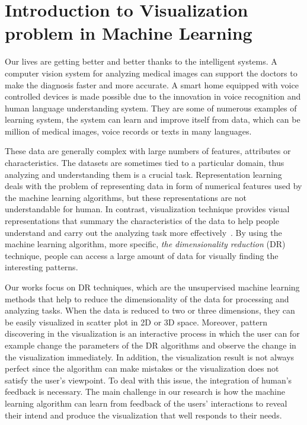 \section{Introduction to Visualization problem in Machine Learning}

Our lives are getting better and better thanks to the intelligent systems.
A computer vision system for analyzing medical images can support the doctors to make the diagnosis faster and more accurate.
A smart home equipped with voice controlled devices is made possible due to the innovation in voice recognition and human language understanding system.
They are some of numerous examples of learning system, the system can learn and improve itself from data, which can be million of medical images, voice records or texts in many languages.

These data are generally complex with large numbers of features, attributes or characteristics.
The datasets are sometimes tied to a particular domain, thus analyzing and understanding them is a crucial task.
Representation learning~\cite{bengio2013representation} deals with the problem of representing data in form of numerical features used by the machine learning algorithms, but these representations are not understandable for human.
In contrast, visualization technique provides visual representations that summary the characteristics of the data to help people understand and carry out the analyzing task more effectively~\cite{munzner2014visualization}.
By using the machine learning algorithm, more specific, \emph{the dimensionality reduction} (DR) technique, people can access a large amount of data for visually finding the interesting patterns.

Our works focus on DR techniques, which are the unsupervised machine learning methods that help to reduce the dimensionality of the data for processing and analyzing tasks.
When the data is reduced to two or three dimensions, they can be easily visualized in scatter plot in 2D or 3D space.
Moreover, pattern discovering in the visualization is an interactive process in which the user can for example change the parameters of the DR algorithms and observe the change in the visualization immediately.
In addition, the visualization result is not always perfect since the algorithm can make mistakes or the visualization does not satisfy the user's viewpoint. To deal with this issue, the integration of human's feedback is necessary.
The main challenge in our research is how the machine learning algorithm can learn from feedback of the users' interactions to reveal their intend and produce the visualization that well responds to their needs.


